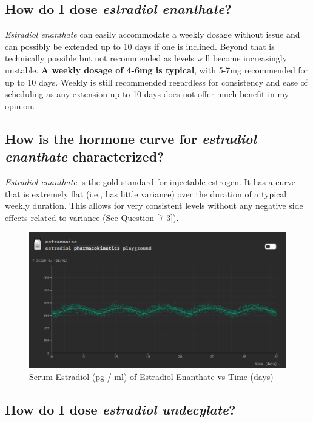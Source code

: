 \documentclass{article}
\begin{document}
\subsection{How do I dose \textit{estradiol enanthate}?}

\textit{Estradiol enanthate} can easily accommodate a weekly dosage without issue and can possibly be extended up to 10 days if one is inclined. Beyond that is technically possible but not recommended as levels will become increasingly unstable. \textbf{A weekly dosage of 4-6mg is typical}, with 5-7mg recommended for up to 10 days. Weekly is still recommended regardless for consistency and ease of scheduling as any extension up to 10 days does not offer much benefit in my opinion.

\subsection{How is the hormone curve for \textit{estradiol enanthate} characterized?}

\textit{Estradiol enanthate} is the gold standard for injectable estrogen. It has a curve that is extremely flat (i.e., has little variance) over the duration of a typical weekly duration. This allows for very consistent levels without any negative side effects related to variance (See Question \ref{7-3}).

 \begin{figure}[H]
     \centering
     \includegraphics[width=1\linewidth]{een.png}
     \caption{Serum Estradiol (pg / ml) of Estradiol Enanthate vs Time (days) }
     \label{fig:een}
 \end{figure}

\subsection{How do I dose\textit{ estradiol undecylate}?}
\end{document}
